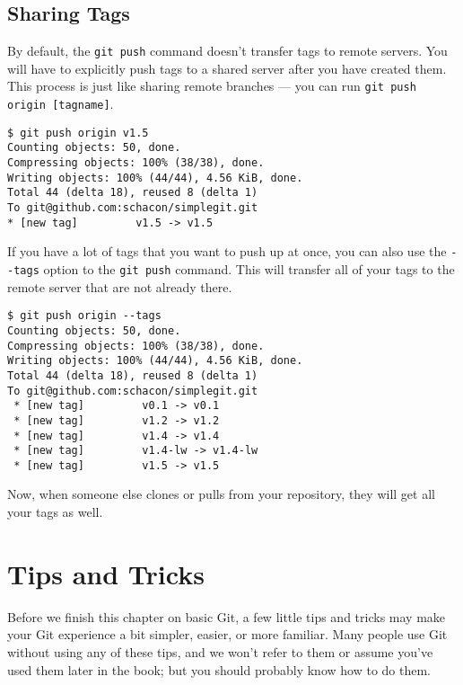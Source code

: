 \documentclass[a4paper]{book}
\begin{document}
\subsection{Sharing Tags}

By default, the \texttt{git push} command doesn't transfer tags to remote servers. You will have to explicitly push tags to a shared server after you have created them. This process is just like sharing remote branches --- you can run \texttt{git push origin {[}tagname{]}}.

\begin{shaded}\begin{verbatim}
$ git push origin v1.5
Counting objects: 50, done.
Compressing objects: 100% (38/38), done.
Writing objects: 100% (44/44), 4.56 KiB, done.
Total 44 (delta 18), reused 8 (delta 1)
To git@github.com:schacon/simplegit.git
* [new tag]         v1.5 -> v1.5
\end{verbatim}\end{shaded}

If you have a lot of tags that you want to push up at once, you can also use the \texttt{-{}-tags} option to the \texttt{git push} command. This will transfer all of your tags to the remote server that are not already there.

\begin{shaded}\begin{verbatim}
$ git push origin --tags
Counting objects: 50, done.
Compressing objects: 100% (38/38), done.
Writing objects: 100% (44/44), 4.56 KiB, done.
Total 44 (delta 18), reused 8 (delta 1)
To git@github.com:schacon/simplegit.git
 * [new tag]         v0.1 -> v0.1
 * [new tag]         v1.2 -> v1.2
 * [new tag]         v1.4 -> v1.4
 * [new tag]         v1.4-lw -> v1.4-lw
 * [new tag]         v1.5 -> v1.5
\end{verbatim}\end{shaded}

Now, when someone else clones or pulls from your repository, they will get all your tags as well.

\section{Tips and Tricks}

Before we finish this chapter on basic Git, a few little tips and tricks may make your Git experience a bit simpler, easier, or more familiar. Many people use Git without using any of these tips, and we won't refer to them or assume you've used them later in the book; but you should probably know how to do them.
\end{document}
